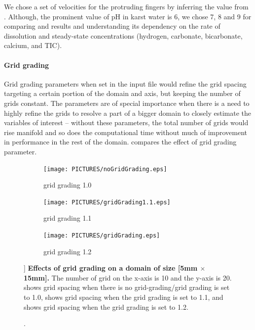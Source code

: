 We chose a set of velocities for the protruding fingers by inferring the value from \citet{Class2020}. 
Although, the prominent value of pH in karst water is 6, we chose 7, 8 and 9 for comparing \DuMuX and 
\MATLAB results and understanding its dependency on the rate of dissolution and steady-state concentrations 
(hydrogen, carbonate, bicarbonate, calcium, and TIC). \\

\paragraph*{Grid grading}\label{para:definitionGridGrading} \mbox{} Grid grading parameters when set in the input file would refine the grid 
spacing targeting a certain portion of the domain and axis, but keeping the number of grids constant. 
The parameters are of special importance when there is a need to highly refine the grids to resolve a part 
of a bigger domain to closely estimate the variables of interest -- without these parameters, the total number 
of grids would rise manifold and so does the computational time without much of improvement in performance in 
the rest of the domain.  compares the effect of grid grading parameter. \\
\begin{figure}[!h]
        \centering
    \begin{subfigure}{.3\linewidth}
        \centering
        \texttt{[image: PICTURES/noGridGrading.eps]}
        \caption{\small grid grading 1.0}
        \label{fig:nogg}       %
    \end{subfigure}%
        \hfill
    \begin{subfigure}{.3\linewidth}
        \centering
        \texttt{[image: PICTURES/gridGrading1.1.eps]}
        \caption{\small grid grading 1.1}
        \label{fig:gg1.1}       %
    \end{subfigure}%
    \hfill
    \begin{subfigure}{.3\linewidth}
        \centering
        \texttt{[image: PICTURES/gridGrading.eps]}
        \caption{\small grid grading 1.2}
        \label{fig:gg1.2}       %
    \end{subfigure}
        \hfill
     \caption [Effects of grid grading on a domain of size [5mm $\times$ 15mm].] {\textbf{Effects of grid 
     grading on a domain of size [5mm $\times$ 15mm].} \small The number of grid on the x-axis is 
     10 and the y-axis is 20.  shows grid spacing when there is no grid-grading/grid grading is set to 1.0, 
      shows grid spacing when the grid grading is set to 1.1, and  shows grid spacing when the grid grading is set to 1.2.}
     \label{fig:gridGrading}
\end{figure}

